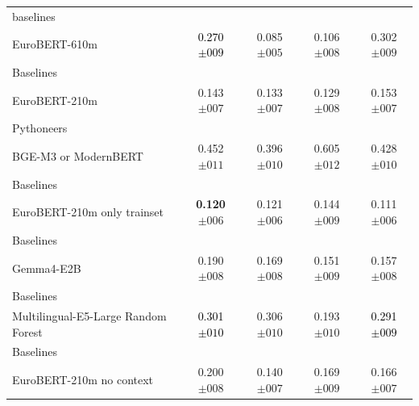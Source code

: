 \begin{tabularx}{\textwidth}{X | c c c c}
baselines\\\subcatarrow{}EuroBERT-610m & \textcolor{Black}{0.270$\pm{}009$} & \textcolor{BrickRed}{0.085$\pm{}005$} & \textcolor{BrickRed}{0.106$\pm{}008$} & \textcolor{White!50!NavyBlue}{0.302$\pm{}009$} \\
Baselines\\\subcatarrow{}EuroBERT-210m & \textcolor{White!50!BrickRed}{0.143$\pm{}007$} & \textcolor{White!50!BrickRed}{0.133$\pm{}007$} & \textcolor{BrickRed}{0.129$\pm{}008$} & \textcolor{White!50!BrickRed}{0.153$\pm{}007$} \\
Pythoneers\\\subcatarrow{}BGE-M3 or ModernBERT & \textcolor{NavyBlue}{0.452$\pm{}011$} & \textcolor{NavyBlue}{0.396$\pm{}010$} & \textcolor{NavyBlue}{0.605$\pm{}012$} & \textcolor{NavyBlue}{0.428$\pm{}010$} \\
Baselines\\\subcatarrow{}EuroBERT-210m only trainset & \textbf{\textcolor{BrickRed}{0.120$\pm{}006$}} & \textcolor{White!50!BrickRed}{0.121$\pm{}006$} & \textcolor{BrickRed}{0.144$\pm{}009$} & \textcolor{BrickRed}{0.111$\pm{}006$} \\
Baselines\\\subcatarrow{}Gemma4-E2B & \textcolor{White!50!BrickRed}{0.190$\pm{}008$} & \textcolor{White!50!BrickRed}{0.169$\pm{}008$} & \textcolor{BrickRed}{0.151$\pm{}009$} & \textcolor{White!50!BrickRed}{0.157$\pm{}008$} \\
Baselines\\\subcatarrow{}Multilingual-E5-Large Random Forest & \textcolor{Black}{0.301$\pm{}010$} & \textcolor{White!50!NavyBlue}{0.306$\pm{}010$} & \textcolor{White!50!BrickRed}{0.193$\pm{}010$} & \textcolor{Black}{0.291$\pm{}009$} \\
Baselines\\\subcatarrow{}EuroBERT-210m no context & \textcolor{White!50!BrickRed}{0.200$\pm{}008$} & \textcolor{White!50!BrickRed}{0.140$\pm{}007$} & \textcolor{White!50!BrickRed}{0.169$\pm{}009$} & \textcolor{White!50!BrickRed}{0.166$\pm{}007$} \\
\hline
\end{tabularx}